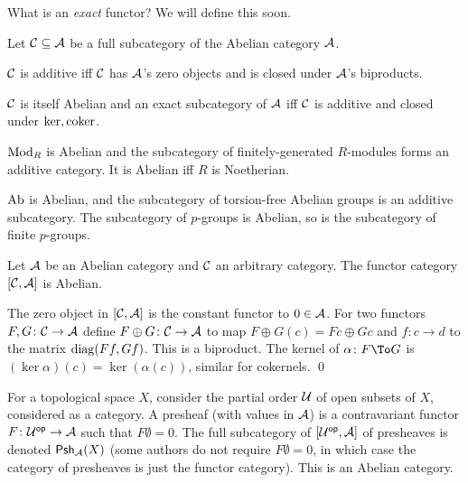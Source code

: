 What is an {\it exact\/} functor?
We will define this soon.

\blemm

    Let ${{\cal C}}\subseteq{{\cal A}}$ be a full subcategory of the Abelian category ${{\cal A}}$.
    \benum
        \item ${{\cal C}}$ is additive iff ${{\cal C}}$ has ${{\cal A}}$'s zero objects and is closed under ${{\cal A}}$'s biproducts.
        \item ${{\cal C}}$ is itself Abelian and an exact subcategory of ${{\cal A}}$ iff ${{\cal C}}$ is additive and closed under ${\rm ker},{\rm coker}$.
    \eenum

\elemm

\bexam

    \benum
        \item ${\rm Mod}_R$ is Abelian and the subcategory of finitely-generated $R$-modules forms an additive category.
        It is Abelian iff $R$ is Noetherian.
        \item ${\rm Ab}$ is Abelian, and the subcategory of torsion-free Abelian groups is an additive subcategory.
        The subcategory of $p$-groups is Abelian, so is the subcategory of finite $p$-groups.
    \eenum

\eexam

\bprop

    Let ${{\cal A}}$ be an Abelian category and ${{\cal C}}$ an arbitrary category.
    The {\emphcolor functor category} $[{{\cal C}},{{\cal A}}]$ is Abelian.

\eprop

\bproof

    The zero object in $[{{\cal C}},{{\cal A}}]$ is the constant functor to $0\in{{\cal A}}$.
    For two functors $F,G\colon{{\cal C}}\to{{\cal A}}$ define $F\oplus G\colon{{\cal C}}\to{{\cal A}}$ to map $F\oplus G(c)=Fc\oplus Gc$ and $f\colon c\to d$ to the matrix ${\rm diag}(Ff,Gf)$.
    This is a biproduct.
    The kernel of $\alpha\colon F\To G$ is $(\ker\alpha)(c)=\ker(\alpha(c))$, similar for cokernels.
    \qed

\eproof

\bdefn

    For a topological space $X$, consider the partial order ${{\cal U}}$ of open subsets of $X$, considered as a category.
    A {\emphcolor presheaf} (with values in ${{\cal A}}$) is a contravariant functor $F\colon{{\cal U}}^{\sf op}\to{{\cal A}}$ such that $F\emptyset=0$.
    The full subcategory of $[{{\cal U}}^{\sf op},{{\cal A}}]$ of presheaves is denoted ${\sf Psh}_{{\cal A}}(X)$ (some authors do not require $F\emptyset=0$, in which case the category of presheaves is just the functor category).
    This is an Abelian category.

\edefn

